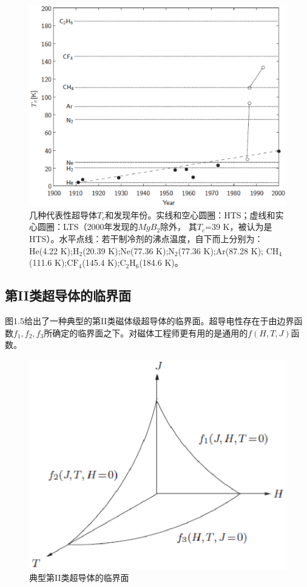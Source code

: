 \begin{figure}%
  \centering
 \includegraphics[scale=0.6]{chpt1/figs/fig1.4.eps}
  \caption{
几种代表性超导体$T_c$和发现年份。实线和空心圆圈：HTS；虚线和实心圆圈：LTS（2000年发现的$MgB_2$除外，
其$	T_c$=39 K，被认为是HTS）。水平点线：若干制冷剂的沸点温度，自下而上分别为：
He(4.22 K);$\mathrm{H_2}$(20.39 K);Ne(77.36 K);$\mathrm{N_2}$(77.36 K);Ar(87.28 K);
$\mathrm{CH_4}$(111.6 K);$\mathrm{CF_4}$(145.4 K);$\mathrm{C_2H_6}$(184.6 K)。
}
\end{figure}


\subsection{第II类超导体的临界面}
图1.5给出了一种典型的第II类磁体级超导体的临界面。超导电性存在于由边界函数$f_1,f_2,f_3$所确定的临界面之下。对磁体工程师更有用的是通用的$f(H,T,J)$函数。
\begin{figure}
  \centering
 \includegraphics[scale=0.6]{chpt1/figs/fig1.5.eps}
  \caption{
典型第II类超导体的临界面
}\label{ciriticalsurface}
\end{figure}

